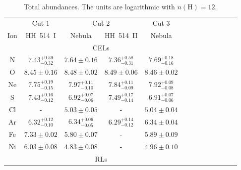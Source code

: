\documentclass[fleqn,usenatbib]{mnras}
\newcommand{\jorge}[1]{{\color{magenta}J: #1}}
\begin{document}


\begin{table}
\centering
\caption{Total abundances. The units are logarithmic with $n(\text{H})=12$.}
\label{tab:total_abundances}
\begin{tabular}{ccccccccccccc}
\hline
 & \multicolumn{1}{c}{Cut 1} & \multicolumn{2}{c}{Cut 2} & \multicolumn{1}{c}{Cut 3} & \\
Ion &  HH~514~I & Nebula & HH~514~II  & Nebula \\
\hline
 & \multicolumn{4}{c}{CELs}\\

N  & $7.43 ^{+0.59} _{-0.32}$ & $7.64 \pm 0.16$ &$7.36 ^{+0.58} _{-0.31}$ & $7.69 ^{+0.18} _{-0.16}$ \\ 

O  & $8.45 \pm 0.16$ & $8.48 \pm 0.02$ &$8.49 \pm 0.06$&$8.46 \pm 0.02$\\

Ne & $7.75 ^{+0.19} _{-0.15}$ & $7.97 ^{+0.11} _{-0.10}$& $7.84 ^{+0.11} _{-0.09}$ & $7.92 ^{+0.09} _{-0.08}$ \\ 

S  & $7.43 ^{+0.16} _{-0.12}$ & $6.92 ^{+0.07} _{-0.06}$& $7.49 ^{+0.17} _{-0.14}$ &$6.91 ^{+0.07} _{-0.06}$\\

Cl & - & $5.03 \pm 0.05$&- &$5.04 \pm 0.04$\\

Ar & $6.32 ^{+0.12} _{-0.10}$ & $6.34 ^{+0.06} _{-0.05}$ & $6.29 ^{+0.14} _{-0.12}$& $6.34 \pm 0.04$\\

Fe & $7.33 \pm 0.02$ & $5.80 \pm 0.07$ & - &$5.89 \pm 0.09$\\


Ni & $6.03 \pm 0.08$ & $4.83 \pm 0.08 $&-&$4.96 \pm 0.10$\\

 & \multicolumn{4}{c}{RLs}\\


\end{tabular}
\end{table}
\end{document}
